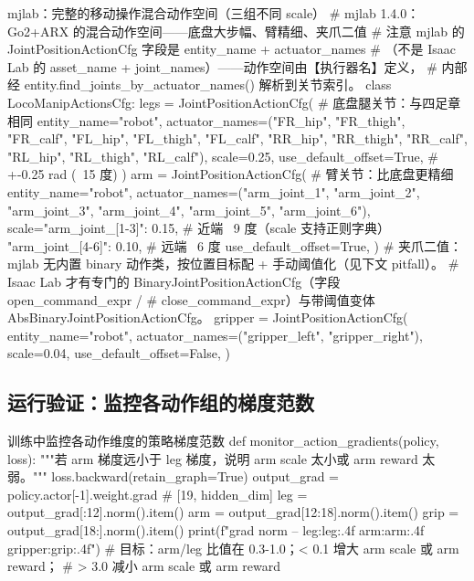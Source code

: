 \begin{codebox}[Python]{mjlab：完整的移动操作混合动作空间（三组不同 scale）}
# mjlab 1.4.0：Go2+ARX 的混合动作空间——底盘大步幅、臂精细、夹爪二值
# 注意 mjlab 的 JointPositionActionCfg 字段是 entity_name + actuator_names
#   （不是 Isaac Lab 的 asset_name + joint_names）——动作空间由【执行器名】定义，
#   内部经 entity.find_joints_by_actuator_names() 解析到关节索引。
class LocoManipActionsCfg:
    legs = JointPositionActionCfg(           # 底盘腿关节：与四足章相同
        entity_name="robot",
        actuator_names=("FR_hip", "FR_thigh", "FR_calf",
                        "FL_hip", "FL_thigh", "FL_calf",
                        "RR_hip", "RR_thigh", "RR_calf",
                        "RL_hip", "RL_thigh", "RL_calf"),
        scale=0.25, use_default_offset=True,            # +-0.25 rad (~15 度)
    )
    arm = JointPositionActionCfg(            # 臂关节：比底盘更精细
        entity_name="robot",
        actuator_names=("arm_joint_1", "arm_joint_2", "arm_joint_3",
                        "arm_joint_4", "arm_joint_5", "arm_joint_6"),
        scale={"arm_joint_[1-3]": 0.15,      # 近端 ~9 度（scale 支持正则字典）
               "arm_joint_[4-6]": 0.10},     # 远端 ~6 度
        use_default_offset=True,
    )
    # 夹爪二值：mjlab 无内置 binary 动作类，按位置目标配 + 手动阈值化（见下文 pitfall）。
    #   Isaac Lab 才有专门的 BinaryJointPositionActionCfg（字段 open_command_expr /
    #   close_command_expr）与带阈值变体 AbsBinaryJointPositionActionCfg。
    gripper = JointPositionActionCfg(
        entity_name="robot",
        actuator_names=("gripper_left", "gripper_right"),
        scale=0.04, use_default_offset=False,
    )
\end{codebox}

\subsection{运行验证：监控各动作组的梯度范数}
\label{sec:rlmc-lm-action-verify}

\begin{codebox}[Python]{训练中监控各动作维度的策略梯度范数}
def monitor_action_gradients(policy, loss):
    """若 arm 梯度远小于 leg 梯度，说明 arm scale 太小或 arm reward 太弱。"""
    loss.backward(retain_graph=True)
    output_grad = policy.actor[-1].weight.grad        # [19, hidden_dim]
    leg = output_grad[:12].norm().item()
    arm = output_grad[12:18].norm().item()
    grip = output_grad[18:].norm().item()
    print(f"grad norm -- leg:{leg:.4f}  arm:{arm:.4f}  gripper:{grip:.4f}")
    # 目标：arm/leg 比值在 0.3-1.0；< 0.1 增大 arm scale 或 arm reward；
    #       > 3.0 减小 arm scale 或 arm reward
\end{codebox}

